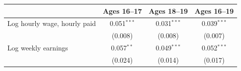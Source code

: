 \begin{tabular}{lccc}
\toprule
 & Ages 16--17 & Ages 18--19 & Ages 16--19 \\
\midrule
Log hourly wage, hourly paid & 0.051$^{***}$ & 0.031$^{***}$ & 0.039$^{***}$ \\
 & (0.008) & (0.008) & (0.007) \\
Log weekly earnings & 0.057$^{**}$ & 0.049$^{***}$ & 0.052$^{***}$ \\
 & (0.024) & (0.014) & (0.017) \\
\bottomrule
\end{tabular}
